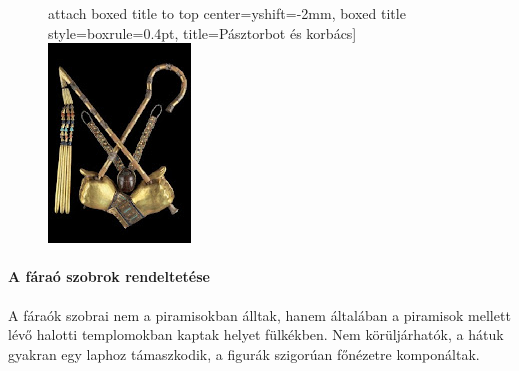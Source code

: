 \begin{figure}[H]
\begin{minipage}{0.45\textwidth}
\begin{tcolorbox}
			attach boxed title to top center={yshift=-2mm},
			boxed title style={boxrule=0.4pt},
			title=Pásztorbot és korbács]{
				\includegraphics[width=1.0\linewidth]{images/01/pasztorbot_korbacs}}
		\end{tcolorbox}
	\end{minipage}
	\captionsetup{labelformat=empty}
	\caption{}
\end{figure}

\paragraph{A fáraó szobrok rendeltetése}
A fáraók szobrai nem a piramisokban álltak, hanem általában a piramisok mellett lévő halotti templomokban kaptak helyet fülkékben. Nem körüljárhatók, a hátuk gyakran egy laphoz támaszkodik, a figurák szigorúan főnézetre komponáltak.

